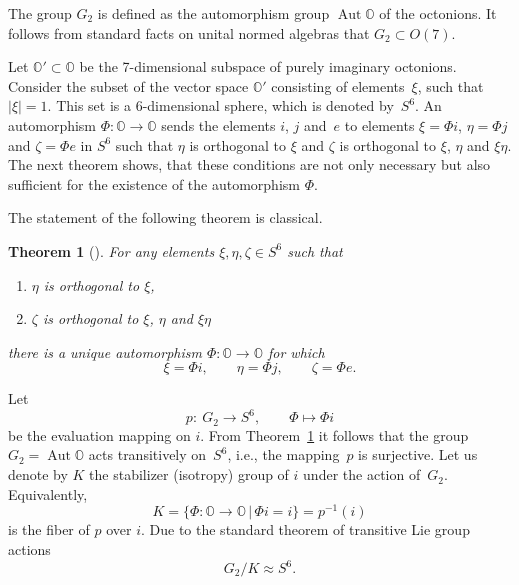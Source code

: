\documentclass[pdftex]{sigma}
\numberwithin{equation}{section}
\newtheorem{Theorem}{Theorem}[section]
\DeclareMathOperator{\Aut}{Aut}
\newcommand{\SO}{\mathbb{O}} %
\begin{document}
The group $G_2$ is defined as the automorphism group $\Aut \SO $ of the octonions. It follows from standard facts on unital normed algebras that $ G_2 \subset O(7)$.

Let $\SO' \subset \SO$ be the 7-dimensional subspace of purely imaginary octonions. Consider the subset of the vector space $\SO'$ consisting of elements~$\xi$, such that $|\xi|=1$. This set is a 6-dimensional sphere, which is denoted by~$S^6$. An automorphism $\Phi \colon \SO \rightarrow \SO$ sends the elements $i$, $j$ and~$e$ to elements $\xi=\Phi i$, $\eta= \Phi j$ and $\zeta = \Phi e$ in $S^6$ such that $\eta$ is orthogonal to $\xi$ and $\zeta$ is orthogonal to $\xi$, $\eta$ and $\xi \eta$. The next theorem shows, that these conditions are not only necessary but also sufficient for the existence of the automorphism $\Phi$.

The statement of the following theorem is classical.
\begin{Theorem}[{\cite[p.~309]{postnikov1986lie}}] \label{thm:autcorr}
 For any elements $\xi, \eta, \zeta \in S^6$ such that
 \begin{enumerate}\itemsep=0pt
 \item[$(a)$] $\eta$ is orthogonal to $\xi$,
 \item[$(b)$] $\zeta$ is orthogonal to $\xi$, $\eta$ and $\xi \eta$
 \end{enumerate}
 there is a unique automorphism $\Phi\colon \SO \rightarrow \SO$ for which \[ \xi=\Phi i,\qquad \eta= \Phi j,\qquad \zeta = \Phi e.\]
\end{Theorem}

Let
\[p\colon \ G_2 \rightarrow S^6,\qquad \Phi \mapsto \Phi i\]
be the evaluation mapping on $i$. From Theorem~\ref{thm:autcorr} it follows that the group $G_2 = \Aut \SO $ acts transitively on~$S^6$, i.e., the mapping~$p$ is surjective. Let us denote by $K$ the stabilizer (isotropy) group of $i$ under the action of~$G_2$. Equivalently,
\[K=\{\Phi\colon \SO \rightarrow \SO \, | \, \Phi i = i \}=p^{-1}(i)\]
is the fiber of $p$ over $i$. Due to the standard theorem \cite[Theorem~9.24]{lee2003introduction} of transitive Lie group actions
\[G_2/K \approx S^6.\]
\end{document}
